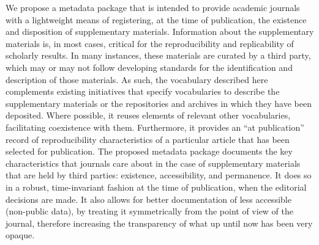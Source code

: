 We propose a metadata package that is intended to provide academic journals with a lightweight means of registering, at the time of publication, the existence and disposition of supplementary materials.  Information about the supplementary materials is, in most cases, critical for the reproducibility and replicability of scholarly results.  In many instances, these materials are curated by a third party, which may or may not follow developing standards for the identification and description of those materials.  As such, the vocabulary described here complements existing initiatives that specify vocabularies to describe the supplementary materials or the repositories and archives in which they have been deposited.  Where possible, it reuses elements of relevant other vocabularies, facilitating coexistence with them.  Furthermore, it provides an ``at publication'' record of reproducibility characteristics of a particular article that has been selected for publication.  The proposed metadata package documents the key characteristics that journals care about in the case of supplementary materials that are held by third parties: existence, accessibility, and permanence. It does so in a robust, time-invariant fashion at the time of publication, when the editorial decisions are made. It also allows for better documentation of less accessible (non-public data), by treating it symmetrically from the point of view of the journal, therefore increasing the transparency of what up until now has been very opaque.